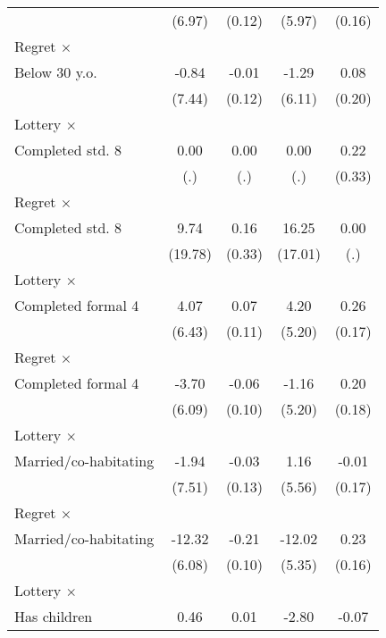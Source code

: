 \begin{table}[htbp]
\begin{tabular}{l*{4}{c}}
                &   (6.97)         &   (0.12)         &   (5.97)         &   (0.16)         \\
\addlinespace
Regret $\times$ \\ Below 30 y.o.&    -0.84         &    -0.01         &    -1.29         &     0.08         \\
                &   (7.44)         &   (0.12)         &   (6.11)         &   (0.20)         \\
\addlinespace
Lottery $\times$ \\ Completed std. 8&     0.00         &     0.00         &     0.00         &     0.22         \\
                &      (.)         &      (.)         &      (.)         &   (0.33)         \\
\addlinespace
Regret $\times$ \\ Completed std. 8&     9.74         &     0.16         &    16.25         &     0.00         \\
                &  (19.78)         &   (0.33)         &  (17.01)         &      (.)         \\
\addlinespace
Lottery $\times$ \\ Completed formal 4&     4.07         &     0.07         &     4.20         &     0.26         \\
                &   (6.43)         &   (0.11)         &   (5.20)         &   (0.17)         \\
\addlinespace
Regret $\times$ \\ Completed formal 4&    -3.70         &    -0.06         &    -1.16         &     0.20         \\
                &   (6.09)         &   (0.10)         &   (5.20)         &   (0.18)         \\
\addlinespace
Lottery $\times$ \\ Married/co-habitating&    -1.94         &    -0.03         &     1.16         &    -0.01         \\
                &   (7.51)         &   (0.13)         &   (5.56)         &   (0.17)         \\
\addlinespace
Regret $\times$ \\ Married/co-habitating&   -12.32\sym{**} &    -0.21\sym{**} &   -12.02\sym{**} &     0.23         \\
                &   (6.08)         &   (0.10)         &   (5.35)         &   (0.16)         \\
\addlinespace
Lottery $\times$ \\ Has children&     0.46         &     0.01         &    -2.80         &    -0.07         \\

\end{tabular}
\end{table}
